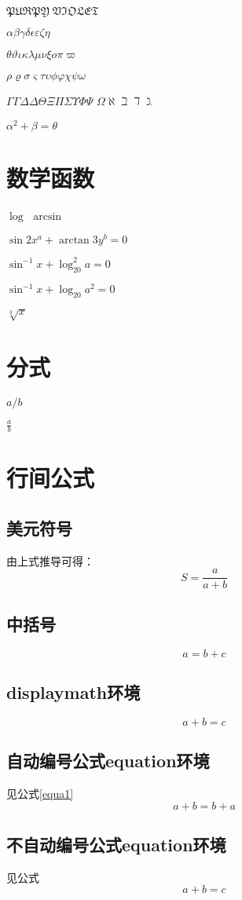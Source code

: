 \documentclass{article}
\begin{document}
    $\mathfrak{PURPY \ VIOLET} $

    $\alpha \beta \gamma \delta \epsilon \varepsilon \zeta \eta $

    $\theta \vartheta \iota \kappa \lambda \mu \nu \xi o \pi \varpi $

    $\rho \varrho \sigma \varsigma \tau \upsilon \phi \varphi \chi \psi \omega $

    $\Gamma \varGamma \Delta \varDelta \Theta \Xi \Pi \Sigma \Upsilon \Phi \Psi $
    $\Omega \aleph \beth \daleth \gimel $

    $\alpha^2 + \beta = \theta$
    \section{数学函数}
    $\log $
    $\arcsin $

    $\sin{2x^{a}} + \arctan{3y^{b}} = 0$

    $\sin^{-1}{x} + \log_{20}^{2} a = 0$

    $\sin^{-1}{x} + \log_{20} a ^{2} = 0$

    $\sqrt[3]{x}$


    \section{分式}

    $a/b$
    
    $\frac{a}{b}$

    \section{行间公式}
    \subsection{美元符号}
    由上式推导可得：
    $$S = \frac{a}{a+b}$$


    \subsection{中括号}
    \[a = b+ c\]

    \subsection{displaymath环境}
    \begin{displaymath}
        a+b = c %
    \end{displaymath}


    \subsection{自动编号公式equation环境} %
    见公式\ref{equa1}
    \begin{equation}
        a+b=b+a \label{equa1}
    \end{equation}

    \subsection{不自动编号公式equation环境} 
    见公式%
    \begin{equation*}
        a+b=c %
    \end{equation*}
\end{document}
